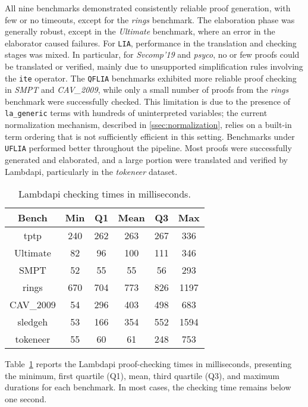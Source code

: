All nine benchmarks demonstrated consistently reliable proof generation, with few or no timeouts, except for the \emph{rings} benchmark.
The elaboration phase was generally robust, except in the \emph{Ultimate} benchmark, where an error in the elaborator caused failures.
For \texttt{LIA}, performance in the translation and checking stages was mixed. In particular, for \emph{Svcomp'19} and \emph{psyco}, no or few proofs could be translated or verified, mainly due to unsupported simplification rules involving the \texttt{ite} operator.
The \texttt{QFLIA} benchmarks exhibited more reliable proof checking in \emph{SMPT} and \emph{CAV\_2009}, while only a small number of proofs from the \emph{rings} benchmark were successfully checked.
This limitation is due to the presence of \texttt{la\_generic} terms with hundreds of uninterpreted variables; the current normalization mechanism, described in \cref{ssec:normalization}, relies on a built-in term ordering that is not sufficiently efficient in this setting.
Benchmarks under \texttt{UFLIA} performed better throughout the pipeline. Most proofs were successfully generated and elaborated, and a large portion were translated and verified by Lambdapi, particularly in the \emph{tokeneer} dataset.

\begin{table}[]
\centering
\begin{tabular}{|c|c|c|c|c|c|}
\hline
\textbf{Bench}      & \textbf{Min} & \textbf{Q1} & \textbf{Mean} & \textbf{Q3} & \textbf{Max} \\ \hline
tptp                & 240          & 262         & 263           & 267         & 336          \\ \hline
Ultimate            & 82           & 96          & 100           & 111         & 346          \\ \hline
SMPT                & 52           & 55          & 55            & 56          & 293          \\ \hline
rings               & 670          & 704         & 773           & 826         & 1197         \\ \hline
CAV\_2009           & 54           & 296         & 403           & 498         & 683          \\ \hline
sledgeh             & 53           & 166         & 354           & 552         & 1594         \\ \hline
tokeneer            & 55           & 60          & 61            & 248         & 753          \\ \hline
\end{tabular}
\caption{Lambdapi checking times in milliseconds.}
\label{table:benchmarks-list}
\end{table}

Table~\ref{table:benchmarks-list} reports the Lambdapi proof-checking times in milliseconds, presenting the minimum, first quartile (Q1), mean, third quartile (Q3), and maximum durations for each benchmark.
In most cases, the checking time remains below one second.
